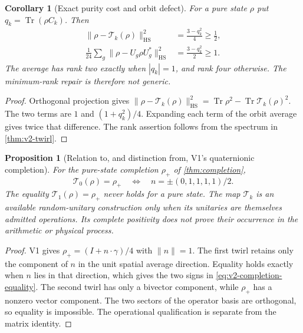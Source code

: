 \documentclass[11pt]{article}
\newtheorem{proposition}[proposition]{Proposition}
\newtheorem{corollary}[corollary]{Corollary}
\theoremstyle{definition}
\theoremstyle{remark}
\newcommand{\Tr}{\operatorname{Tr}}
\newcommand{\HS}{\mathrm{HS}}
\newcommand{\norm}[1]{\lVert#1\rVert}
\begin{document}
\begin{corollary}[Exact purity cost and orbit defect]
\label{cor:v2-twirl-gap}
For a pure state $\rho$ put $q_k=\Tr(\rho C_k)$. Then
\begin{align}
 \norm{\rho-\mathcal T_k(\rho)}_{\HS}^2
 &=\frac{3-q_k^2}{4}\ge\frac12,\label{eq:v2-state-gap}\\
 \frac1{24}\sum_g\norm{\rho-U_g\rho U_g^*}_{\HS}^2
 &=\frac{3-q_k^2}{2}\ge1.\label{eq:v2-orbit-gap}
\end{align}
The average has rank two exactly when $|q_k|=1$, and rank four otherwise.
The minimum-rank repair is therefore not generic.
\end{corollary}
\begin{proof}
Orthogonal projection gives
$\norm{\rho-\mathcal T_k(\rho)}_{\HS}^2
=\Tr\rho^2-\Tr\mathcal T_k(\rho)^2$.
The two terms are $1$ and $(1+q_k^2)/4$. Expanding each term of the orbit
average gives twice that difference. The rank assertion follows from the
spectrum in \cref{thm:v2-twirl}.
\end{proof}

\begin{proposition}[Relation to, and distinction from, V1's quaternionic completion]
\label{prop:v2-two-completions}
For the pure-state completion $\rho_+$ of \cref{thm:completion},
\begin{equation}
 \mathcal T_0(\rho)=\rho_+
 \quad\Longleftrightarrow\quad
 n=\pm(0,1,1,1,1)/2.
 \label{eq:v2-completion-equality}
\end{equation}
The equality $\mathcal T_1(\rho)=\rho_+$ never holds for a pure state.
The map $\mathcal T_k$ is an available random-unitary construction only
when its unitaries are themselves admitted operations. Its complete
positivity does not prove their occurrence in the arithmetic or physical
process.
\end{proposition}
\begin{proof}
V1 gives $\rho_+=(I+n\cdot\gamma)/4$ with $\norm n=1$.
The first twirl retains only the component of $n$ in the unit spatial
average direction. Equality holds exactly when $n$ lies in that direction,
which gives the two signs in \eqref{eq:v2-completion-equality}. The second
twirl has only a bivector component, while $\rho_+$ has a nonzero vector
component. The two sectors of the operator basis are orthogonal, so equality
is impossible. The operational qualification is separate from the matrix
identity.
\end{proof}
\end{document}
